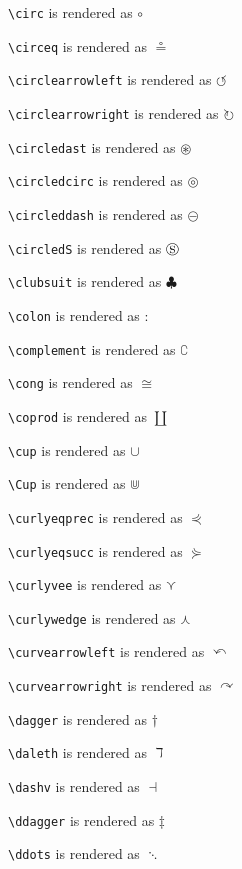 \texttt{\textbackslash circ} is rendered as $\circ$


\texttt{\textbackslash circeq} is rendered as $\circeq$


\texttt{\textbackslash circlearrowleft} is rendered as $\circlearrowleft$


\texttt{\textbackslash circlearrowright} is rendered as $\circlearrowright$


\texttt{\textbackslash circledast} is rendered as $\circledast$


\texttt{\textbackslash circledcirc} is rendered as $\circledcirc$


\texttt{\textbackslash circleddash} is rendered as $\circleddash$


\texttt{\textbackslash circledS} is rendered as $\circledS$


\texttt{\textbackslash clubsuit} is rendered as $\clubsuit$


\texttt{\textbackslash colon} is rendered as $\colon$


\texttt{\textbackslash complement} is rendered as $\complement$


\texttt{\textbackslash cong} is rendered as $\cong$


\texttt{\textbackslash coprod} is rendered as $\coprod$


\texttt{\textbackslash cup} is rendered as $\cup$


\texttt{\textbackslash Cup} is rendered as $\Cup$


\texttt{\textbackslash curlyeqprec} is rendered as $\curlyeqprec$


\texttt{\textbackslash curlyeqsucc} is rendered as $\curlyeqsucc$


\texttt{\textbackslash curlyvee} is rendered as $\curlyvee$


\texttt{\textbackslash curlywedge} is rendered as $\curlywedge$


\texttt{\textbackslash curvearrowleft} is rendered as $\curvearrowleft$


\texttt{\textbackslash curvearrowright} is rendered as $\curvearrowright$


\texttt{\textbackslash dagger} is rendered as $\dagger$


\texttt{\textbackslash daleth} is rendered as $\daleth$


\texttt{\textbackslash dashv} is rendered as $\dashv$


\texttt{\textbackslash ddagger} is rendered as $\ddagger$


\texttt{\textbackslash ddots} is rendered as $\ddots$


